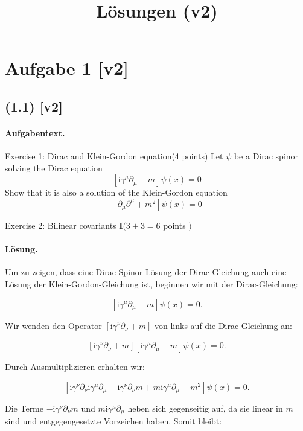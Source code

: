\documentclass[11pt,a4paper]{article}
\title{Lösungen (v2)}
\date{}
\begin{document}
\maketitle

\section*{Aufgabe 1 [v2]}
\subsection*{(1.1) [v2]}
\paragraph{Aufgabentext.}
Exercise 1: Dirac and Klein-Gordon equation(4 points)
Let $\psi$ be a Dirac spinor solving the Dirac equation
$$
\left[\mathrm{i} \gamma^\mu \partial_\mu-m\right] \psi(x)=0
$$
Show that it is also a solution of the Klein-Gordon equation
$$
\left[\partial_\mu \partial^\mu+m^2\right] \psi(x)=0
$$



Exercise 2: Bilinear covariants $\mathbf{I}(3+3=6$ points $)$

\paragraph{Lösung.}
Um zu zeigen, dass eine Dirac-Spinor-Lösung der Dirac-Gleichung auch eine Lösung der Klein-Gordon-Gleichung ist, beginnen wir mit der Dirac-Gleichung:

\[
\left[\mathrm{i} \gamma^\mu \partial_\mu - m\right] \psi(x) = 0.
\]

Wir wenden den Operator \(\left[\mathrm{i} \gamma^\nu \partial_\nu + m\right]\) von links auf die Dirac-Gleichung an:

\[
\left[\mathrm{i} \gamma^\nu \partial_\nu + m\right] \left[\mathrm{i} \gamma^\mu \partial_\mu - m\right] \psi(x) = 0.
\]

Durch Ausmultiplizieren erhalten wir:

\[
\left[\mathrm{i} \gamma^\nu \partial_\nu \mathrm{i} \gamma^\mu \partial_\mu - \mathrm{i} \gamma^\nu \partial_\nu m + m \mathrm{i} \gamma^\mu \partial_\mu - m^2\right] \psi(x) = 0.
\]

Die Terme \(- \mathrm{i} \gamma^\nu \partial_\nu m\) und \(m \mathrm{i} \gamma^\mu \partial_\mu\) heben sich gegenseitig auf, da sie linear in \(m\) sind und entgegengesetzte Vorzeichen haben. Somit bleibt:
\end{document}
